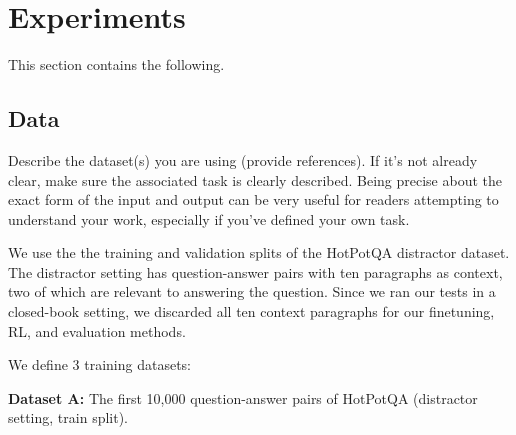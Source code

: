\documentclass{article}
\begin{document}
\section{Experiments}
This section contains the following.

\subsection{Data}
Describe the dataset(s) you are using (provide references). If it's not already clear, make sure the associated task is clearly described.
Being precise about the exact form of the input and output can be very useful for readers attempting to understand your work, especially if you've defined your own task.

We use the the training and validation splits of the HotPotQA \cite{yang2018hotpotqadatasetdiverseexplainable} distractor dataset. The distractor setting has question-answer pairs with ten paragraphs as context, two of which are relevant to answering the question. Since we ran our tests in a closed-book setting, we discarded all ten context paragraphs for our finetuning, RL, and evaluation methods.

We define 3 training datasets:

\textbf{Dataset A: } The first 10,000 question-answer pairs of HotPotQA (distractor setting, train split).
\end{document}
